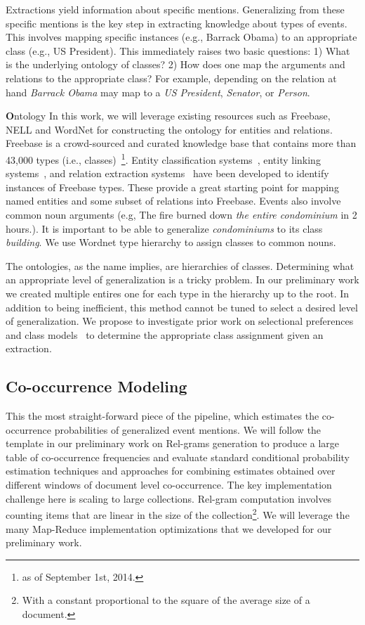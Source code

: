Extractions yield information about specific mentions. Generalizing from these specific mentions is the key step in extracting knowledge about types of events. This involves mapping specific instances (e.g., Barrack Obama) to an appropriate class (e.g., US President). This immediately raises two basic questions: 1) What is the underlying ontology of classes? 2) How does one map the arguments and relations to the appropriate class? For example, depending on the relation at hand {\em Barrack Obama} may map to a {\em US President}, {\em Senator}, or {\em Person}.  

{\textbf Ontology} In this work, we will leverage existing resources such as Freebase, NELL and WordNet for constructing the ontology for entities and relations. Freebase is a crowd-sourced and curated knowledge base that contains more than 43,000 types (i.e., classes)~\footnote{as of September 1st, 2014.}. Entity classification systems~\cite{xiao}, entity linking systems~\cite{tlin}, and relation extraction systems~\cite{multir} have been developed to identify instances of Freebase types. These provide a great starting 
point for mapping named entities and some subset of relations into Freebase. Events also involve common noun arguments (e.g, The fire burned down {\em the entire condominium} in 2 hours.). It is important to be able to generalize {\em condominiums} to its class {\em building}. We use Wordnet type hierarchy to assign classes to common nouns.

The ontologies, as the name implies, are hierarchies of classes. Determining what an appropriate level of generalization is a tricky problem. In our preliminary work we created multiple entires one for each type in the hierarchy up to the root. In addition to being inefficient, this method cannot be tuned to select a desired level of generalization. We propose to investigate prior work on selectional preferences and class models~\cite{} to determine the appropriate class assignment given an extraction.
 
\subsection{Co-occurrence Modeling}

This the most straight-forward piece of the pipeline, which estimates the co-occurrence probabilities of generalized event mentions. We will follow the template in our preliminary work on Rel-grams generation to produce a large table of co-occurrence frequencies and evaluate standard conditional probability estimation techniques and approaches for combining estimates obtained over different windows of document level co-occurrence. The key implementation challenge here is scaling to large collections. Rel-gram computation involves counting items that are linear in the size of the collection\footnote{With a constant proportional to the square of the average size of a document.}. We will leverage the many Map-Reduce implementation optimizations that we developed for our preliminary work.
 
